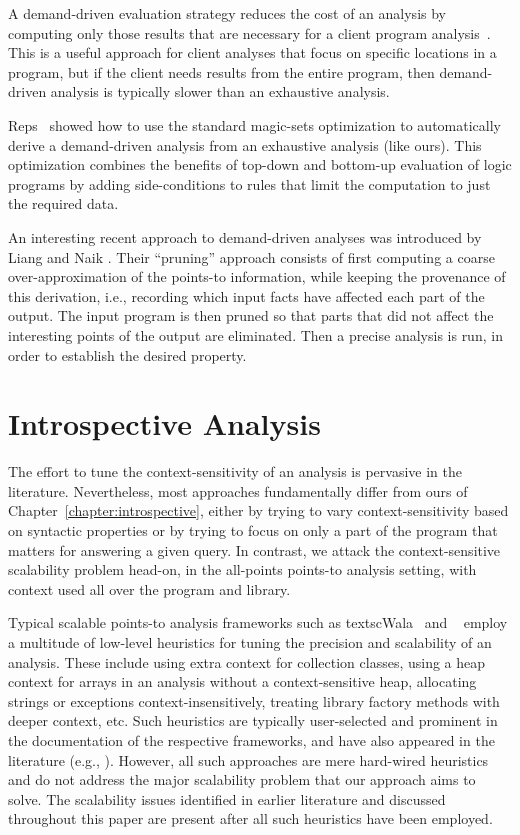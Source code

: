A demand-driven evaluation strategy reduces the cost of an analysis by computing only those results that are necessary for a client program analysis~\cite{oopsla:2005:Sridharan,pldi:2006:Sridharan,popl:2008:Zheng,pldi:2001:Heintze}. This is a useful approach for client analyses that focus on specific locations in a program, but if the client needs results from the entire program, then demand-driven analysis is typically slower than an exhaustive analysis.

Reps~\cite{cc:1994:Reps} showed how to use the standard magic-sets optimization to automatically derive a demand-driven analysis from an exhaustive analysis (like ours). This optimization combines the benefits of top-down and bottom-up evaluation of logic programs by adding side-conditions to rules that limit the computation to just the required data.

An interesting recent approach to demand-driven analyses was introduced by Liang and Naik \cite{pldi:2011:Liang}. Their ``pruning'' approach consists of first computing a coarse over-approximation of the points-to information, while keeping the provenance of this derivation, i.e., recording which input facts have affected each part of the output. The input program is then pruned so that parts that did not affect the interesting points of the output are eliminated. Then a precise analysis is run, in order to establish the desired property.



\section{Introspective Analysis}

The effort to tune the context-sensitivity of an analysis is pervasive in the literature. Nevertheless, most approaches fundamentally differ from ours of Chapter~\ref{chapter:introspective}, either by trying to vary context-sensitivity based on syntactic properties or by trying to focus on only a part of the program that matters for answering a given query. In contrast, we attack the context-sensitive scalability problem  head-on, in the all-points points-to analysis setting, with context used all over the program and library.

Typical scalable points-to analysis frameworks such as textsc{Wala}~\cite{www:wala} and \doop{}~\cite{oopsla:2009:Bravenboer} employ a multitude of low-level heuristics for tuning the precision and scalability of an analysis. These include using extra context for collection classes, using a heap context for arrays in an analysis without a context-sensitive heap, allocating strings or exceptions context-insensitively, treating library factory methods with deeper context, etc. Such heuristics are typically user-selected and prominent in the documentation of the respective frameworks, and have also appeared in the literature (e.g., \cite{pldi:2009:Tripp,cc:2013:Kastrinis}). However, all such approaches are mere hard-wired heuristics and do not address the major scalability problem that our approach aims to solve. The scalability issues identified in earlier literature and discussed throughout this paper are present after all such heuristics have been employed.

